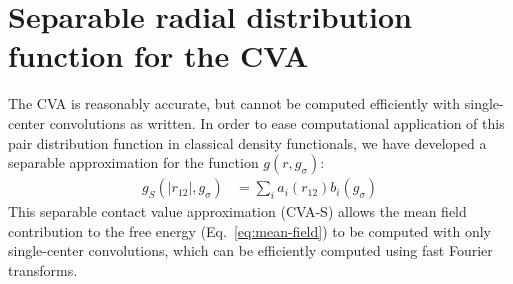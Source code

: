 \documentclass[letterpaper,twocolumn,amsmath,amssymb,pre,aps,10pt]{revtex4-1}
\begin{document}
\newcommand\kappaO{\kappa_0}
\newcommand\kappaI{\kappa_1}
\newcommand\kappaZ{\kappa_2}



\section{Separable radial distribution function for the CVA}

The CVA is reasonably accurate, but cannot be computed efficiently
with single-center convolutions as written.  In order to ease
computational application of this pair distribution function in
classical density functionals, we have developed a separable
approximation for the function $g(r,g_\sigma)$:
\begin{align}
  g_S(|r_{12}|, g_\sigma) &= \sum_{i} a_i(r_{12}) b_i(g_\sigma)
\end{align}
This separable contact value approximation (CVA-S) allows the mean
field contribution to the free energy (Eq.~\ref{eq:mean-field}) to be
computed with only single-center convolutions, which can be
efficiently computed using fast Fourier transforms.


\end{document}

